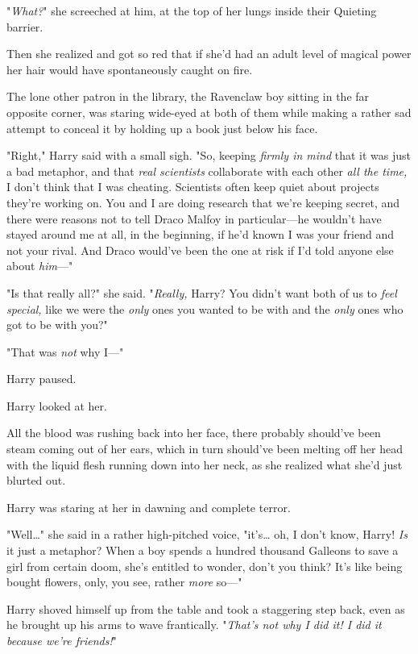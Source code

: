 "\emph{What?}" she screeched at him, at the top of her lungs inside their 
Quieting barrier.

Then she realized and got so red that if she'd had an adult level of magical 
power her hair would have spontaneously caught on fire.

The lone other patron in the library, the Ravenclaw boy sitting in the far 
opposite corner, was staring wide-eyed at both of them while making a rather 
sad attempt to conceal it by holding up a book just below his face.

"Right," Harry said with a small sigh. "So, keeping \emph{firmly in mind} that 
it was just a bad metaphor, and that \emph{real scientists} collaborate with 
each other \emph{all the time,} I don't think that I was cheating. Scientists 
often keep quiet about projects they're working on. You and I are doing 
research that we're keeping secret, and there were reasons not to tell Draco 
Malfoy in particular---he wouldn't have stayed around me at all, in the 
beginning, if he'd known I was your friend and not your rival. And Draco 
would've been the one at risk if I'd told anyone else about \emph{him}---"

"Is that really all?" she said. "\emph{Really,} Harry? You didn't want both of 
us to \emph{feel special,} like we were the \emph{only} ones you wanted to be 
with and the \emph{only} ones who got to be with you?"

"That was \emph{not} why I---"

Harry paused.

Harry looked at her.

All the blood was rushing back into her face, there probably should've been 
steam coming out of her ears, which in turn should've been melting off her head 
with the liquid flesh running down into her neck, as she realized what she'd 
just blurted out.

Harry was staring at her in dawning and complete terror.

"Well{\ldots}" she said in a rather high-pitched voice, "it's{\ldots} oh, I 
don't know, Harry! \emph{Is} it just a metaphor? When a boy spends a hundred 
thousand Galleons to save a girl from certain doom, she's entitled to wonder, 
don't you think? It's like being bought flowers, only, you see, rather 
\emph{more} so---"

Harry shoved himself up from the table and took a staggering step back, even as 
he brought up his arms to wave frantically. "\emph{That's not why I did it! I 
did it because we're friends!}"

